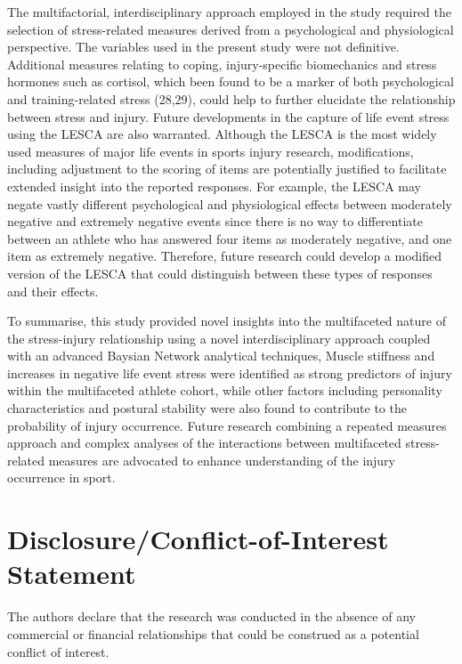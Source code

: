\documentclass[
  english,
  man]{apa6}
\begin{document}
The multifactorial, interdisciplinary approach employed in the study required the selection of stress-related measures derived from a psychological and physiological perspective. The variables used in the present study were not definitive.
Additional measures relating to coping, injury-specific biomechanics and stress hormones such as cortisol, which been found to be a marker of both psychological and training-related stress (28,29), could help to further elucidate the relationship between stress and injury. Future developments in the capture of life event stress using the LESCA are also warranted. Although the LESCA is the most widely used measures of major life events in sports injury research, modifications, including adjustment to the scoring of items are potentially justified to facilitate extended insight into the reported responses. For example, the LESCA may negate vastly different psychological and physiological effects between moderately negative and extremely negative events since there is no way to differentiate between an athlete who has answered four items as moderately negative, and one item as extremely negative. Therefore, future research could develop a modified version of the LESCA that could distinguish between these types of responses and their effects.

To summarise, this study provided novel insights into the multifaceted nature of the stress-injury relationship using a novel interdisciplinary approach coupled with an advanced Baysian Network analytical techniques, Muscle stiffness and increases in negative life event stress were identified as strong predictors of injury within the multifaceted athlete cohort, while other factors including personality characteristics and postural stability were also found to contribute to the probability of injury occurrence. Future research combining a repeated measures approach and complex analyses of the interactions between multifaceted stress-related measures are advocated to enhance understanding of the injury occurrence in sport.

\hypertarget{disclosureconflict-of-interest-statement}{%
\section{Disclosure/Conflict-of-Interest Statement}\label{disclosureconflict-of-interest-statement}}

The authors declare that the research was conducted in the absence of any
commercial or financial relationships that could be construed as a potential
conflict of interest.
\end{document}
